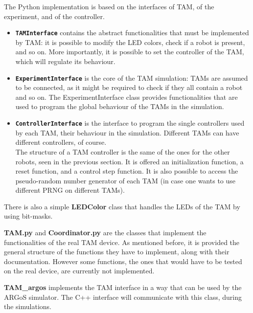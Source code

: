 \documentclass[
12pt,
a4paper,
oneside,
headinclude,
footinclude]{article}
\theoremstyle{definition} %
\begin{document}
The Python implementation is based on the interfaces of TAM, of the experiment, and of the controller. 
\begin{itemize}
    \item \textbf{\texttt{TAMInterface}} contains the abstract functionalities that must be implemented by TAM: it is possible to modify the LED colors, check if a robot is present, and so on. More importantly, it is possible to set the controller of the TAM, which will regulate its behaviour.
    
    \item \textbf{\texttt{ExperimentInterface}} is the core of the TAM simulation: TAMs are assumed to be connected, as it might be required to check if they all contain a robot and so on. The ExperimentInterface class provides functionalities that are used to program the global behaviour of the TAMs in the simulation.
    
    \item \textbf{\texttt{ControllerInterface}} is the interface to program the single controllers used by each TAM, their behaviour in the simulation. Different TAMs can have different controllers, of course. \\
    The structure of a TAM controller is the same of the ones for the other robots, seen in the previous section. It is offered an initialization function, a reset function, and a control step function. It is also possible to access the pseudo-random number generator of each TAM (in case one wants to use different PRNG on different TAMs).
\end{itemize}

There is also a simple \textbf{LEDColor} class that handles the LEDs of the TAM by using bit-masks.

\textbf{TAM.py} and \textbf{Coordinator.py} are the classes that implement the functionalities of the real TAM device. As mentioned before, it is provided the general structure of the functions they have to implement, along with their documentation. However some functions, the ones that would have to be tested on the real device, are currently not implemented.

\textbf{TAM\_argos} implements the TAM interface in a way that can be used by the ARGoS simulator. The C++ interface will communicate with this class, during the simulations.



\newpage

\textbf{}
\end{document}

